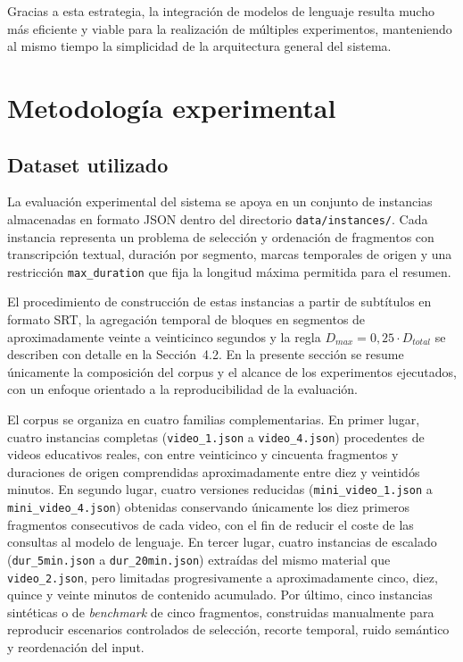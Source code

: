 \documentclass[12pt,a4paper]{article}
\begin{document}
Gracias a esta estrategia, la integración de modelos de lenguaje resulta mucho más eficiente y viable para la realización de múltiples experimentos, manteniendo al mismo tiempo la simplicidad de la arquitectura general del sistema.


\section{Metodología experimental}

\subsection{Dataset utilizado}

La evaluación experimental del sistema se apoya en un conjunto de instancias almacenadas en formato JSON dentro del directorio \texttt{data/instances/}. Cada instancia representa un problema de selección y ordenación de fragmentos con transcripción textual, duración por segmento, marcas temporales de origen y una restricción \texttt{max\_duration} que fija la longitud máxima permitida para el resumen.

El procedimiento de construcción de estas instancias a partir de subtítulos en formato SRT, la agregación temporal de bloques en segmentos de aproximadamente veinte a veinticinco segundos y la regla \(D_{max} = 0{,}25 \cdot D_{total}\) se describen con detalle en la Sección~4.2. En la presente sección se resume únicamente la composición del corpus y el alcance de los experimentos ejecutados, con un enfoque orientado a la reproducibilidad de la evaluación.

El corpus se organiza en cuatro familias complementarias. En primer lugar, cuatro instancias completas (\texttt{video\_1.json} a \texttt{video\_4.json}) procedentes de videos educativos reales, con entre veinticinco y cincuenta fragmentos y duraciones de origen comprendidas aproximadamente entre diez y veintidós minutos. En segundo lugar, cuatro versiones reducidas (\texttt{mini\_video\_1.json} a \texttt{mini\_video\_4.json}) obtenidas conservando únicamente los diez primeros fragmentos consecutivos de cada video, con el fin de reducir el coste de las consultas al modelo de lenguaje. En tercer lugar, cuatro instancias de escalado (\texttt{dur\_5min.json} a \texttt{dur\_20min.json}) extraídas del mismo material que \texttt{video\_2.json}, pero limitadas progresivamente a aproximadamente cinco, diez, quince y veinte minutos de contenido acumulado. Por último, cinco instancias sintéticas o de \textit{benchmark} de cinco fragmentos, construidas manualmente para reproducir escenarios controlados de selección, recorte temporal, ruido semántico y reordenación del input.
\end{document}
